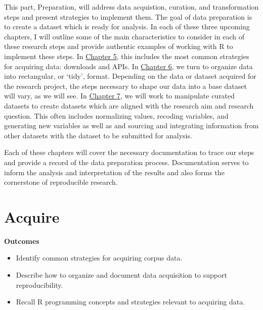 \documentclass[
  letterpaper,
  krantz1]{latex/krantz-mod}
\providecommand{\tightlist}{%
  \setlength{\itemsep}{0pt}\setlength{\parskip}{0pt}}\usepackage{longtable,booktabs,array}
\newcommand{\setDOI}[1]{\gdef\doi{#1}}
\theoremstyle{definition}
\theoremstyle{definition}
\theoremstyle{remark}
\begin{document}
This part, Preparation, will address data acquistion, curation, and
transformation steps and present strategies to implement them. The goal
of data preparation is to create a dataset which is ready for analysis.
In each of these three upcoming chapters, I will outline some of the
main characteristics to consider in each of these research steps and
provide authentic examples of working with R to implement these steps.
In \hyperref[sec-acquire-chapter]{Chapter 5}, this includes the most
common strategies for acquiring data: downloads and APIs. In
\hyperref[sec-curate-data]{Chapter 6}, we turn to organize data into
rectangular, or `tidy', format. Depending on the data or dataset
acquired for the research project, the steps necessary to shape our data
into a base dataset will vary, as we will see. In
\hyperref[sec-transform-data]{Chapter 7}, we will work to manipulate
curated datasets to create datasets which are aligned with the research
aim and research question. This often includes normalizing values,
recoding variables, and generating new variables as well as and sourcing
and integrating information from other datasets with the dataset to be
submitted for analysis.

Each of these chapters will cover the necessary documentation to trace
our steps and provide a record of the data preparation process.
Documentation serves to inform the analysis and interpretation of the
results and also forms the cornerstone of reproducible research.

\chapter{Acquire}\label{sec-acquire-chapter}

\setDOI{10.4324/9781003393764.5}
\thispagestyle{chapterfirstpage}

\begin{tcolorbox}[enhanced jigsaw, leftrule=.75mm, colframe=quarto-callout-color-frame, left=2mm, colback=white, toprule=.15mm, breakable, arc=.35mm, opacityback=0, bottomrule=.15mm, rightrule=.15mm]

\textbf{ Outcomes}

\begin{itemize}
\tightlist
\item
  Identify common strategies for acquiring corpus data.
\item
  Describe how to organize and document data acquisition to support
  reproducibility.
\item
  Recall R programming concepts and strategies relevant to acquiring
  data.
\end{itemize}

\end{tcolorbox}
\end{document}
